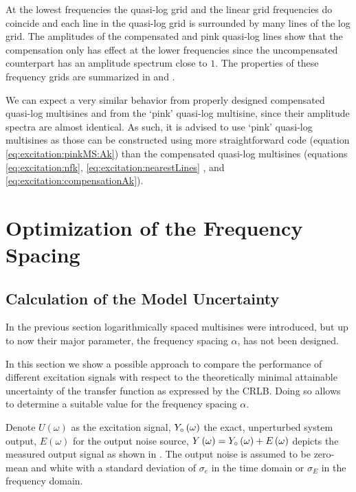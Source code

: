   At the lowest frequencies the quasi-log grid and the linear grid frequencies do coincide and each line in the quasi-log grid is surrounded by many lines of the log grid.
  The amplitudes of the compensated and pink quasi-log lines show that the compensation only has effect at the lower frequencies since the uncompensated counterpart has an amplitude spectrum close to $1$.
  The properties of these frequency grids are summarized in  and .

  We can expect a very similar behavior from properly designed compensated quasi-log multisines and from the `pink' quasi-log multisine, since their amplitude spectra are almost identical.
  As such, it is advised to use `pink' quasi-log multisines as those can be constructed using more straightforward code (equation \eqref{eq:excitation:pinkMS:Ak}) than the compensated quasi-log multisines (equations \eqref{eq:excitation:nfk}, \eqref{eq:excitation:nearestLines} , and \eqref{eq:excitation:compensationAk}).

\section{Optimization of the Frequency Spacing} 
\label{sec:excitation:optimAlpha}
  \subsection{Calculation of the Model Uncertainty}
  In the previous section logarithmically spaced multisines were introduced, but up to now their major parameter, the frequency spacing $\alpha$, has not been designed.

  In this section we show a possible approach to compare the performance of different excitation signals with respect to the theoretically minimal attainable uncertainty of the transfer function as expressed by the \gls{CRLB}.
  Doing so allows to determine a suitable value for the frequency spacing $\alpha$.

  Denote
    $U  \left(\omega\right)$ as the excitation signal,
    $\true{Y}\left(\omega\right)$ the exact, unperturbed system output,
    $E  \left(\omega\right)$ for the output noise source,
    $Y  \left(\omega\right) = \true{Y}\left( \omega \right) + E\left( \omega \right)$ depicts the measured output signal as shown in .
    The output noise is assumed to be zero-mean and white with a standard deviation of $\sigma_e$ in the time domain or $\sigma_E$ in the frequency domain.

